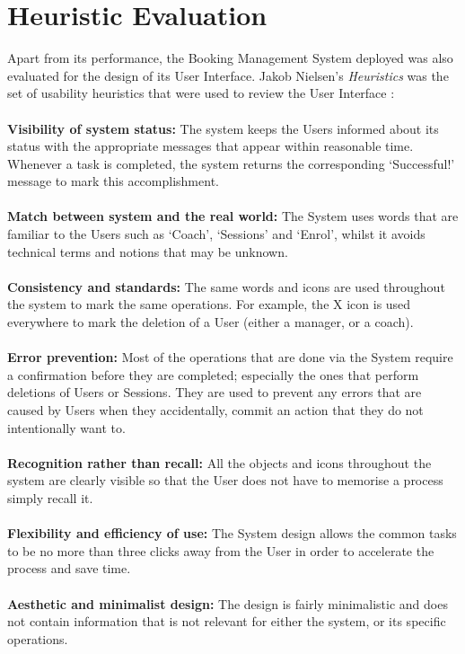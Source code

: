 \documentclass{l3proj}
\begin{document}
\section{Heuristic Evaluation}
Apart from its performance, the Booking Management System deployed was also evaluated for the design of its User Interface. Jakob Nielsen's \emph{Heuristics} was the set of usability heuristics that were used to review the User Interface \cite{heuristics}:\\
\\
\textbf{Visibility of system status:}
The system keeps the Users informed about its status with the appropriate messages that appear within reasonable time. Whenever a task is completed, the system returns the corresponding `Successful!' message to mark this accomplishment.\\
 \\
\textbf{Match between system and the real world:}
The System uses words that are familiar to the Users such as `Coach', `Sessions' and `Enrol', whilst it avoids technical terms and notions that may be unknown.\\
 \\
\textbf{Consistency and standards:}
The same words and icons are used throughout the system to mark the same operations. For example, the X icon is used everywhere to mark the deletion of a User (either a manager, or a coach).\\
 \\
\textbf{Error prevention:}
Most of the operations that are done via the System require a confirmation before they are completed; especially the ones that perform deletions of Users or Sessions. They are used to prevent any errors that are caused by Users when they accidentally, commit an action that they do not intentionally want to.\\
 \\
\textbf{Recognition rather than recall:}
All the objects and icons throughout the system are clearly visible so that the User does not have to memorise a process simply recall it.\\
 \\
\textbf{Flexibility and efficiency of use:}
The System design allows the common tasks to be no more than three clicks away from the User in order to accelerate the process and save time.\\
 \\
\textbf{Aesthetic and minimalist design:}
The design is fairly minimalistic and does not contain information that is not relevant for either the system, or its specific operations.\\
\end{document}
